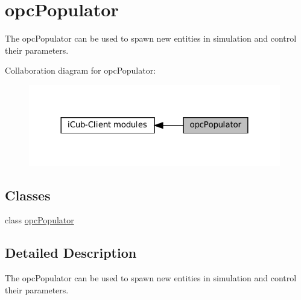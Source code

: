 \hypertarget{group__opcPopulator}{}\section{opc\+Populator}
\label{group__opcPopulator}


The opc\+Populator can be used to spawn new entities in simulation and control their parameters.  


Collaboration diagram for opc\+Populator\+:
\nopagebreak
\begin{figure}[H]
\begin{center}
\leavevmode
\includegraphics[width=312pt]{group__opcPopulator}
\end{center}
\end{figure}
\subsection*{Classes}
\begin{DoxyCompactItemize}
\item 
class \hyperlink{group__opcPopulator_classopcPopulator}{opc\+Populator}
\end{DoxyCompactItemize}


\subsection{Detailed Description}
The opc\+Populator can be used to spawn new entities in simulation and control their parameters. 

